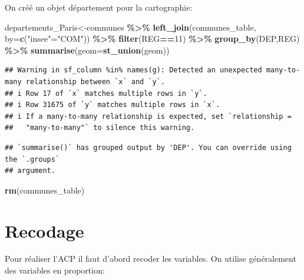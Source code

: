 \documentclass[
]{book}
\newenvironment{Shaded}{\begin{snugshade}}{\end{snugshade}}
\newcommand{\AttributeTok}[1]{\textcolor[rgb]{0.13,0.29,0.53}{#1}}
\newcommand{\DecValTok}[1]{\textcolor[rgb]{0.00,0.00,0.81}{#1}}
\newcommand{\FunctionTok}[1]{\textcolor[rgb]{0.13,0.29,0.53}{\textbf{#1}}}
\newcommand{\NormalTok}[1]{#1}
\newcommand{\OtherTok}[1]{\textcolor[rgb]{0.56,0.35,0.01}{#1}}
\newcommand{\SpecialCharTok}[1]{\textcolor[rgb]{0.81,0.36,0.00}{\textbf{#1}}}
\newcommand{\StringTok}[1]{\textcolor[rgb]{0.31,0.60,0.02}{#1}}
\begin{document}
On créé un objet département pour la cartographie:

\begin{Shaded}
\begin{Highlighting}[]
\NormalTok{departements\_Paris}\OtherTok{\textless{}{-}}\NormalTok{communes }\SpecialCharTok{\%\textgreater{}\%}
  \FunctionTok{left\_join}\NormalTok{(communes\_table, }\AttributeTok{by=}\FunctionTok{c}\NormalTok{(}\StringTok{"insee"}\OtherTok{=}\StringTok{"COM"}\NormalTok{)) }\SpecialCharTok{\%\textgreater{}\%}
  \FunctionTok{filter}\NormalTok{(REG}\SpecialCharTok{==}\DecValTok{11}\NormalTok{) }\SpecialCharTok{\%\textgreater{}\%}
  \FunctionTok{group\_by}\NormalTok{(DEP,REG) }\SpecialCharTok{\%\textgreater{}\%}
  \FunctionTok{summarise}\NormalTok{(}\AttributeTok{geom=}\FunctionTok{st\_union}\NormalTok{(geom))}
\end{Highlighting}
\end{Shaded}

\begin{verbatim}
## Warning in sf_column %in% names(g): Detected an unexpected many-to-many relationship between `x` and `y`.
## i Row 17 of `x` matches multiple rows in `y`.
## i Row 31675 of `y` matches multiple rows in `x`.
## i If a many-to-many relationship is expected, set `relationship =
##   "many-to-many"` to silence this warning.
\end{verbatim}

\begin{verbatim}
## `summarise()` has grouped output by 'DEP'. You can override using the `.groups`
## argument.
\end{verbatim}

\begin{Shaded}
\begin{Highlighting}[]
\FunctionTok{rm}\NormalTok{(communes\_table)}
\end{Highlighting}
\end{Shaded}

\hypertarget{recodage}{%
\section{Recodage}\label{recodage}}

Pour réaliser l'ACP il faut d'abord recoder les variables. On utilise généralement des variables en proportion:
\end{document}
